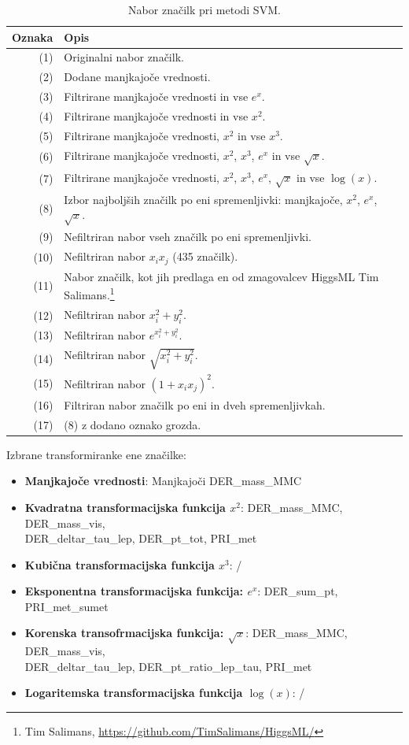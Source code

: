 \documentclass[11pt,a4paper,openany]{book}
\begin{document}
\begin{table}[h!]
	\centering
	\begin{tabular}{r|l}
		\textbf{Oznaka} & \textbf{Opis} \\
		\hline
		(1) & Originalni nabor značilk. \\
		(2) & Dodane manjkajoče vrednosti. \\
		(3) & Filtrirane manjkajoče vrednosti in vse $e^x$. \\
		(4) & Filtrirane manjkajoče vrednosti in vse $x^2$. \\
		(5) & Filtrirane manjkajoče vrednosti, $x^2$ in vse $x^3$. \\
		(6) & Filtrirane manjkajoče vrednosti, $x^2$, $x^3$, $e^x$ in vse $\sqrt{x}$. \\
		(7) & Filtrirane manjkajoče vrednosti, $x^2$, $x^3$, $e^x$, $\sqrt{x}$ in vse $\log(x)$. \\
		(8) & Izbor najboljših značilk po eni spremenljivki: manjkajoče, $x^2$, $e^x$, $\sqrt{x}$. \\
		(9) & Nefiltriran nabor vseh značilk po eni spremenljivki. \\
		(10) & Nefiltriran nabor $x_ix_j$ (435 značilk). \\
		(11) & Nabor značilk, kot jih predlaga en od zmagovalcev HiggsML Tim Salimans.\footnote{Tim Salimans, \url{https://github.com/TimSalimans/HiggsML/}} \\
		(12) & Nefiltriran nabor $x_i^2 + y_i^2$. \\
		(13) & Nefiltriran nabor $e^{x_i^2 + y_i^2}$. \\		
		(14) & Nefiltriran nabor $\sqrt{x_i^2 + y_i^2}$. \\
		(15) & Nefiltriran nabor $(1 + x_ix_j)^2$. \\
		(16) & Filtriran nabor značilk po eni in dveh spremenljivkah. \\
		(17) & (8) z dodano oznako grozda. \\
	\end{tabular}
	\caption{Nabor značilk pri metodi SVM.}	
	\label{tb:feature_sets}
\end{table}
\newpage
\noindent Izbrane transformiranke ene značilke:
\begin{itemize}
	\item \textbf{Manjkajoče vrednosti}: Manjkajoči DER\_mass\_MMC
	\item \textbf{Kvadratna transformacijska funkcija $x^2$}: DER\_mass\_MMC, DER\_mass\_vis, \\ 
		DER\_deltar\_tau\_lep, DER\_pt\_tot, PRI\_met
	\item \textbf{Kubična transformacijska funkcija $x^3$}: /
	\item \textbf{Eksponentna transformacijska funkcija: $e^x$}: DER\_sum\_pt, PRI\_met\_sumet
	\item \textbf{Korenska transofrmacijska funkcija: $\sqrt{x}$}: DER\_mass\_MMC, DER\_mass\_vis, \\	DER\_deltar\_tau\_lep, DER\_pt\_ratio\_lep\_tau, PRI\_met
	\item \textbf{Logaritemska transformacijska funkcija $\log(x)$}: /
\end{itemize}
\end{document}
